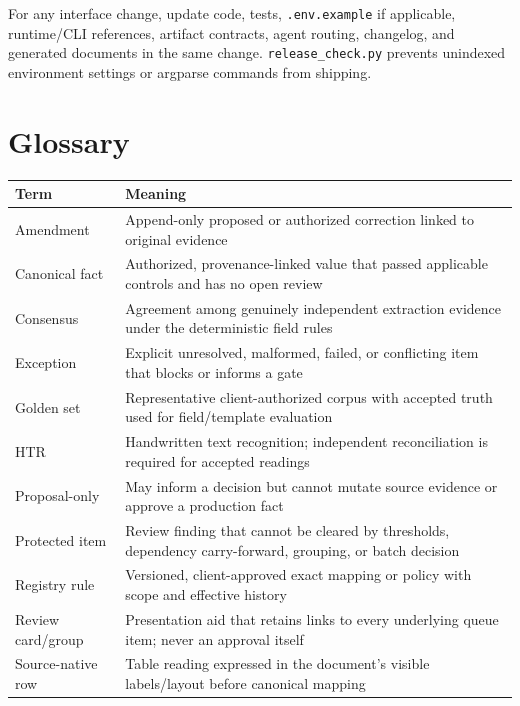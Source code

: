 \documentclass[
]{article}
\newcounter{none} %
\begin{document}
For any interface change, update code, tests, \texttt{.env.example} if
applicable, runtime/CLI references, artifact contracts, agent routing,
changelog, and generated documents in the same change.
\texttt{release\_\allowbreak{}check.py} prevents unindexed environment
settings or argparse commands from shipping.

\section{Glossary}\label{glossary}

{\def\LTcaptype{none} %
\begin{longtable}[]{@{}
  >{\raggedright\arraybackslash}p{}
  >{\raggedright\arraybackslash}p{}@{}}
\toprule\noalign{}
\begin{minipage}[b]{\linewidth}\raggedright
Term
\end{minipage} & \begin{minipage}[b]{\linewidth}\raggedright
Meaning
\end{minipage} \\
\midrule\noalign{}
\endhead
\bottomrule\noalign{}
\endlastfoot
Amendment & Append-only proposed or authorized correction linked to
original evidence \\
Canonical fact & Authorized, provenance-linked value that passed
applicable controls and has no open review \\
Consensus & Agreement among genuinely independent extraction evidence
under the deterministic field rules \\
Exception & Explicit unresolved, malformed, failed, or conflicting item
that blocks or informs a gate \\
Golden set & Representative client-authorized corpus with accepted truth
used for field/template evaluation \\
HTR & Handwritten text recognition; independent reconciliation is
required for accepted readings \\
Proposal-only & May inform a decision but cannot mutate source evidence
or approve a production fact \\
Protected item & Review finding that cannot be cleared by thresholds,
dependency carry-forward, grouping, or batch decision \\
Registry rule & Versioned, client-approved exact mapping or policy with
scope and effective history \\
Review card/group & Presentation aid that retains links to every
underlying queue item; never an approval itself \\
Source-native row & Table reading expressed in the document's visible
labels/layout before canonical mapping \\
\end{longtable}
}
\end{document}
